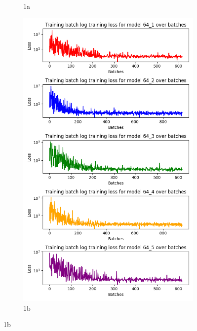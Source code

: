 \begin{figure}[H]
\begin{subfigure}{0.5\textwidth}
        \caption{1a}
        \label{fig:t-loss-128}
    \end{subfigure}%
    \begin{subfigure}{0.5\textwidth}
        \centering
        \includegraphics[width=0.95\linewidth]{Images/Results/Training_loss_64.png}
        \caption{1b}
        \label{fig:t-loss-64}
    \end{subfigure}
    \label{fig:t-loss}
\end{figure}

